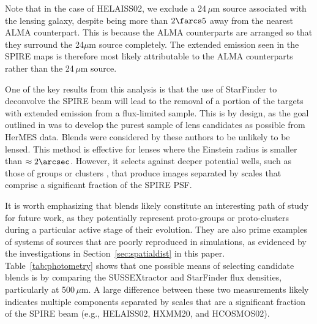 \documentclass[iop]{emulateapj}
\begin{document}
Note that in the case of HELAISS02, we exclude a 24$\,\mu$m source associated
with the lensing galaxy, despite being more than $2\farcs5$ away from the
nearest ALMA counterpart.  This is because the ALMA counterparts are arranged
so that they surround the 24$\mu$m source completely.  The extended emission
seen in the SPIRE maps is therefore most likely attributable to the ALMA
counterparts rather than the 24$\,\mu$m source.

One of the key results from this analysis is that the use of StarFinder to
deconvolve the SPIRE beam will lead to the removal of a portion of the targets
with extended emission from a flux-limited sample.  This is by design, as the
goal outlined in \citet{Wardlow:2013lr} was to develop the purest sample of
lens candidates as possible from HerMES data.  Blends were considered by these
authors to be unlikely to be lensed.  This method is effective for lenses where
the Einstein radius is smaller than $\approx 2\arcsec$.  However, it selects
against deeper potential wells, such as those of groups or clusters
\citep[e.g., HLock01][]{Gavazzi:2011lr}, that produce images separated by
scales that comprise a significant fraction of the SPIRE PSF.

It is worth emphasizing that blends likely constitute an interesting path of
study for future work, as they potentially represent proto-groups or
proto-clusters during a particular active stage of their evolution.  They are
also prime examples of systems of sources that are poorly reproduced in
simulations, as evidenced by the investigations in
Section~\ref{sec:spatialdist} in this paper.  Table~\ref{tab:photometry} shows
that one possible means of selecting candidate blends is by comparing the
SUSSEXtractor and StarFinder flux densities, particularly at 500$\,\mu$m.  A
large difference between these two measurements likely indicates multiple
components separated by scales that are a significant fraction of the SPIRE
beam (e.g., HELAISS02, HXMM20, and HCOSMOS02).


\end{document}

